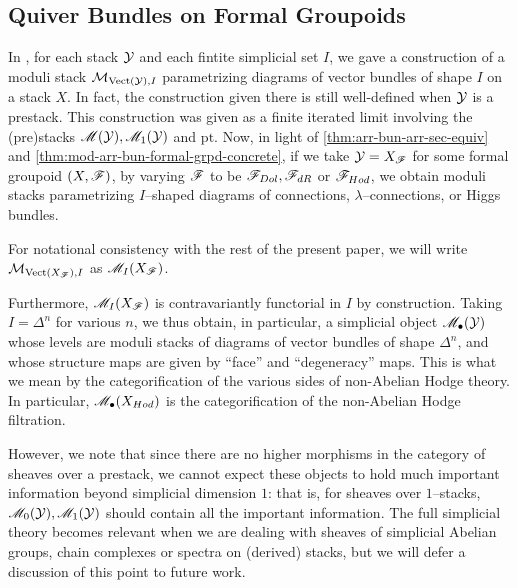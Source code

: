 \documentclass[11pt]{amsart}
\begin{document}

\subsection{Quiver Bundles on Formal Groupoids}\label{subsec:QuivBun}

In \cite[\S 4]{ModQuivBun}, for each stack $\mathcal{Y}$ and each fintite simplicial
set $I$, we gave a construction of a moduli stack $\mathcal{M}_{\mathrm{Vect}(\mathcal{Y}), I}$
parametrizing diagrams of vector bundles of shape $I$ on a stack $X$. In fact,
the construction given there is still well-defined when $\mathcal{Y}$ is a prestack.
This construction was given as a finite iterated limit involving the (pre)stacks
$\mathscr{M}(\mathcal{Y}), \mathscr{M}_1(\mathcal{Y})$ and $\mathrm{pt}$. Now, in light of
\cref{thm:arr-bun-arr-sec-equiv} and
\cref{thm:mod-arr-bun-formal-grpd-concrete}, if we take $\mathcal{Y} = X_\mathscr{F}$
for some formal groupoid $(X, \mathscr{F})$, by varying $\mathscr{F}$ to be
$\mathscr{F}_{Dol}, \mathscr{F}_{dR}$ or $\mathscr{F}_{Hod}$, we obtain
moduli stacks parametrizing $I$--shaped diagrams of connections,
$\lambda$--connections, or Higgs bundles.

\begin{notn}
For notational consistency with the rest of the present paper,
we will write $\mathcal{M}_{\mathrm{Vect}(X_\mathscr{F}), I}$ as $\mathscr{M}_I(X_\mathscr{F})$.
\end{notn}

Furthermore, $\mathscr{M}_I(X_\mathscr{F})$ is contravariantly functorial in $I$ by
construction. Taking $I = \Delta^n$ for various $n$, we thus obtain, in
particular, a simplicial object $\mathscr{M}_{\bullet}(\mathcal{Y})$ whose levels are moduli
stacks of diagrams of vector bundles of shape $\Delta^n$, and whose structure
maps are given by ``face'' and ``degeneracy'' maps. This is what we mean by the
categorification of the various sides of non-Abelian Hodge theory. In
particular, $\mathscr{M}_\bullet(X_{Hod})$ is the categorification of the non-Abelian
Hodge filtration.

\begin{rmk}\label{rmk:smplcl-stacks}
However, we note that since there are no higher morphisms in the
category of sheaves over a prestack, we cannot expect these objects to hold much
important information beyond simplicial dimension $1$: that is, for sheaves over
$1$--stacks, $\mathscr{M}_0(\mathcal{Y}), \mathscr{M}_1(\mathcal{Y})$ should contain all the important
information. The full simplicial theory becomes relevant when we are dealing
with sheaves of simplicial Abelian groups, chain complexes or spectra on
(derived) stacks, but we will defer a discussion of this point to future
work.
\end{rmk}
\end{document}
